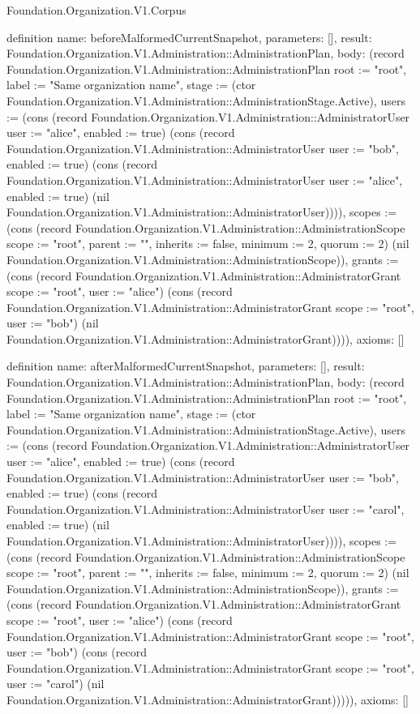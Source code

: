 \begin{lexlean}{Foundation.Organization.V1.Corpus}
\begin{semanticmodule}
definition{
  name: beforeMalformedCurrentSnapshot,
  parameters: [],
  result: Foundation.Organization.V1.Administration::AdministrationPlan,
  body: (record Foundation.Organization.V1.Administration::AdministrationPlan {root := "root", label := "Same organization name", stage := (ctor Foundation.Organization.V1.Administration::AdministrationStage.Active), users := (cons (record Foundation.Organization.V1.Administration::AdministratorUser {user := "alice", enabled := true}) (cons (record Foundation.Organization.V1.Administration::AdministratorUser {user := "bob", enabled := true}) (cons (record Foundation.Organization.V1.Administration::AdministratorUser {user := "alice", enabled := true}) (nil Foundation.Organization.V1.Administration::AdministratorUser)))), scopes := (cons (record Foundation.Organization.V1.Administration::AdministrationScope {scope := "root", parent := "", inherits := false, minimum := 2, quorum := 2}) (nil Foundation.Organization.V1.Administration::AdministrationScope)), grants := (cons (record Foundation.Organization.V1.Administration::AdministratorGrant {scope := "root", user := "alice"}) (cons (record Foundation.Organization.V1.Administration::AdministratorGrant {scope := "root", user := "bob"}) (nil Foundation.Organization.V1.Administration::AdministratorGrant)))}),
  axioms: []
}

definition{
  name: afterMalformedCurrentSnapshot,
  parameters: [],
  result: Foundation.Organization.V1.Administration::AdministrationPlan,
  body: (record Foundation.Organization.V1.Administration::AdministrationPlan {root := "root", label := "Same organization name", stage := (ctor Foundation.Organization.V1.Administration::AdministrationStage.Active), users := (cons (record Foundation.Organization.V1.Administration::AdministratorUser {user := "alice", enabled := true}) (cons (record Foundation.Organization.V1.Administration::AdministratorUser {user := "bob", enabled := true}) (cons (record Foundation.Organization.V1.Administration::AdministratorUser {user := "carol", enabled := true}) (nil Foundation.Organization.V1.Administration::AdministratorUser)))), scopes := (cons (record Foundation.Organization.V1.Administration::AdministrationScope {scope := "root", parent := "", inherits := false, minimum := 2, quorum := 2}) (nil Foundation.Organization.V1.Administration::AdministrationScope)), grants := (cons (record Foundation.Organization.V1.Administration::AdministratorGrant {scope := "root", user := "alice"}) (cons (record Foundation.Organization.V1.Administration::AdministratorGrant {scope := "root", user := "bob"}) (cons (record Foundation.Organization.V1.Administration::AdministratorGrant {scope := "root", user := "carol"}) (nil Foundation.Organization.V1.Administration::AdministratorGrant))))}),
  axioms: []
}


\end{semanticmodule}
\end{lexlean}
